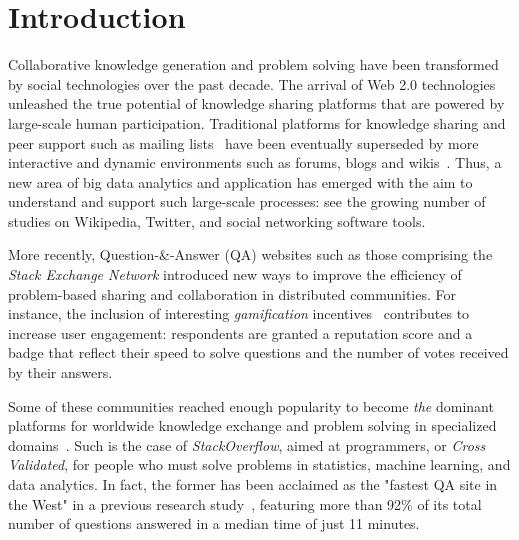 \documentclass{chi2012}
\begin{document}







\section{Introduction}

Collaborative knowledge generation and problem solving have been 
transformed by social technologies over the past decade. The arrival
of Web 2.0 technologies unleashed the true potential of knowledge sharing
platforms that are powered by large-scale human participation. 
Traditional platforms for knowledge sharing and peer support
such as mailing lists~\cite{kuk2006} have been eventually superseded by more 
interactive and dynamic environments such as forums, blogs and 
wikis~\cite{wagner2004}. Thus, a new area of big data analytics and 
application has emerged with the aim to understand and support such large-scale processes: 
see the growing number of studies on Wikipedia, Twitter, and social networking software tools.

More recently, Question-\&-Answer (QA) websites such as those comprising 
the \textit{Stack Exchange Network} introduced new ways to improve the 
efficiency of problem-based sharing and collaboration in distributed communities.
For instance, the inclusion of interesting \textit{gamification} incentives~\cite{deterding2011} contributes to increase user engagement: respondents are 
granted a reputation score and a badge that reflect their speed to solve questions 
and the number of votes received by their answers.

Some of these communities reached enough popularity to become \textit{the} 
dominant platforms for worldwide knowledge exchange and problem solving in
specialized domains~\cite{vasilescu2014}. Such is the case of \textit{StackOverflow}, 
aimed at programmers, or \textit{Cross Validated}, for people who must solve problems in
statistics, machine learning, and data analytics. In fact, the former 
has been acclaimed as the "fastest QA site in the West" in a previous 
research study~\cite{mamykina2011}, featuring more than 92\% of its
total number of questions answered in a median time of just 11 minutes. 
\end{document}
